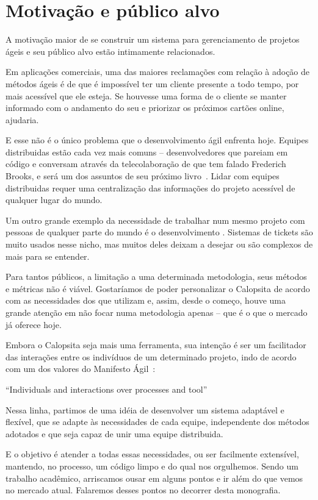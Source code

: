\section{Motivação e público alvo}

A motivação maior de se construir um sistema para gerenciamento de projetos ágeis e seu público alvo estão intimamente relacionados. 

Em aplicações comerciais, uma das maiores reclamações com relação à adoção de métodos ágeis é de que é impossível ter um cliente presente a todo tempo, por mais acessível que ele esteja. Se houvesse uma forma de o cliente se manter informado com o andamento do seu \software e priorizar os próximos cartões online, ajudaria.

E esse não é o único problema que o desenvolvimento ágil enfrenta hoje. Equipes distribuidas estão cada vez mais comuns -- desenvolvedores que pareiam em código e conversam através da telecolaboração de que tem falado Frederich Brooks, e será um dos assuntos de seu próximo livro~\cite{brooks}. Lidar com equipes distribuidas requer uma centralização das informações do projeto acessível de qualquer lugar do mundo.

Um outro grande exemplo da necessidade de trabalhar num mesmo projeto com pessoas de qualquer parte do mundo é o desenvolvimento \opensource. Sistemas de tickets são muito usados nesse nicho, mas muitos deles deixam a desejar ou são complexos de mais para se entender.

Para tantos públicos, a limitação a uma determinada metodologia, seus métodos e métricas não é viável. Gostaríamos de poder personalizar o Calopsita de acordo com as necessidades dos que utilizam e, assim, desde o começo, houve uma grande atenção em não focar numa metodologia apenas -- que é o que o mercado já oferece hoje.

Embora o Calopsita seja mais uma ferramenta, sua intenção é ser um facilitador das interações entre os indivíduos de um determinado projeto, indo de acordo com um dos valores do Manifesto Ágil~\cite{manifesto}:

``Individuals and interactions over processes and tool''

Nessa linha, partimos de uma idéia de desenvolver um sistema adaptável e flexível, que se adapte às necessidades de cada equipe, independente dos métodos adotados e que seja capaz de unir uma equipe distribuida.

E o objetivo é atender a todas essas necessidades, ou ser facilmente extensível, mantendo, no processo, um código limpo e do qual nos orgulhemos. Sendo um trabalho acadêmico, arriscamos ousar em alguns pontos e ir além do que vemos no mercado atual. Falaremos desses pontos no decorrer desta monografia.
